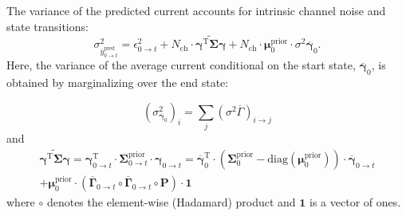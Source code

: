 \documentclass[pdflatex,sn-mathphys-num]{sn-jnl}%
\theoremstyle{thmstyleone}%
\theoremstyle{thmstyletwo}%
\theoremstyle{thmstylethree}%
\begin{document}
The variance of the predicted current accounts for intrinsic channel noise and state transitions:
\begin{equation}
	\sigma^2_{\overline{y}^{\text{pred}}_{0 \rightarrow t}} = \epsilon^2_{0 \rightarrow t} + N_{\text{ch}} \cdot \widetilde{\mathbf{\gamma}^{\mathrm{T}} \mathbf{\Sigma}\mathbf{\gamma}} + 
	N_{\text{ch}} \cdot \mathbf{\mu}^{\mathrm{prior}}_{0} \cdot {\sigma^2 \overline{\mathbf{\gamma}}}_{0}.
	\label{eq:macro_interval_sigma_pred}
\end{equation}
Here, the variance of the average current conditional on the start state, \( \overline{\mathbf{\gamma}}_{0} \), is obtained by marginalizing over the end state:

\begin{equation}
	(\sigma^2_{\overline{\mathbf{\gamma}}_{0}})_i = \sum_j (\sigma^2 \overline{\Gamma})_{i \rightarrow j}
	\label{eq:sigma_gamma_i}
\end{equation}
and
\begin{multline}
	\widetilde{\mathbf{\gamma}^{\mathrm{T}} \mathbf{\Sigma}\mathbf{\gamma}}=   \mathbf{\gamma}^{\mathrm{T}}_{0 \rightarrow t} \cdot \mathbf{\Sigma}^{\mathrm{prior}}_{0 \rightarrow t} \cdot \mathbf{\gamma}_{0 \rightarrow t}=
	\overline{\mathbf{\gamma}}_{0}^{\mathrm{T}} \cdot 
	\left( \mathbf{\Sigma}^{\mathrm{prior}}_{0} - \mathrm{diag}(\mathbf{\mu}^{\mathrm{prior}}_0) \right) \cdot 
	\overline{\mathbf{\gamma}}_{0 \rightarrow t} \\
	+ \mathbf{\mu}^{\mathrm{prior}}_0 \cdot \left( \overline{\mathbf{\Gamma}}_{0 \rightarrow t} \circ \overline{\mathbf{\Gamma}}_{0 \rightarrow t} \circ \mathbf{P} \right) \cdot \mathbf{1}
	\label{eq:simplified_meta_state}
\end{multline}
where \( \circ \) denotes the element-wise (Hadamard) product and \( \mathbf{1} \) is a vector of ones.
\end{document}

